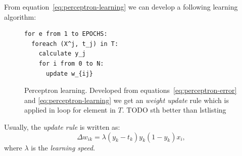 From equation~\ref{eq:perceptron-learning} we can develop a following learning algorithm: 
\begin{figure}[h]
  \centering
\begin{lstlisting}
for e from 1 to EPOCHS: 
  foreach (X^j, t_j) in T: 
    calculate y_j
    for i from 0 to N: 
      update w_{ij}
\end{lstlisting}
  \caption{Perceptron learning. Developed from equations~\ref{eq:perceptron-error} and \ref{eq:perceptron-learning} we get an \emph{weight update} rule which is applied in loop for element in $T$. TODO sth better than lstlisting} 
  \label{fig:perceptron-learning}
\end{figure}

Usually, the \emph{update rule} is written as: 
\begin{equation} 
\Delta w_{ik} = \lambda (y_k - t_k)y_k(1 - y_k)x_i,
\end{equation} 
where $\lambda$ is the \emph{learning speed}. 

